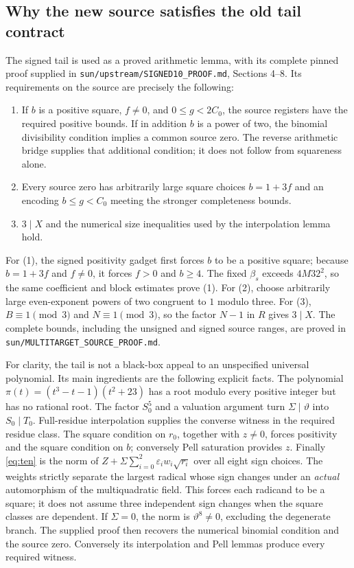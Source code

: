 \documentclass[11pt]{article}
\begin{document}
\subsection{Why the new source satisfies the old tail contract}
The signed tail is used as a proved arithmetic lemma, with its complete
pinned proof supplied in \texttt{sun/upstream/SIGNED10\_PROOF.md}, Sections
4--8. Its requirements on the source are precisely the following:
\begin{enumerate}
\item If $b$ is a positive square, $f\ne0$, and $0\le g<2C_0$, the source registers have the required positive bounds. If in addition
$b$ is a power of two, the binomial divisibility condition implies a common
source zero. The reverse arithmetic bridge supplies that additional condition;
it does not follow from squareness alone.
\item Every source zero has arbitrarily large square choices $b=1+3f$ and
an encoding $b\le g<C_0$ meeting the stronger completeness bounds.
\item $3\mid X$ and the numerical size inequalities used by the interpolation
lemma hold.
\end{enumerate}
For (1), the signed positivity gadget first forces $b$ to be a positive
square; because $b=1+3f$ and $f\ne0$, it forces $f>0$ and $b\ge4$.
The fixed $\beta_s$ exceeds $4M32^2$, so the same coefficient and block
estimates prove (1). For (2), choose arbitrarily large even-exponent powers
of two congruent to $1$ modulo three. For (3), $B\equiv1\pmod3$ and
$N\equiv1\pmod3$, so the factor $N-1$ in $R$ gives $3\mid X$.
The complete bounds, including the unsigned and signed source ranges, are
proved in \texttt{sun/MULTITARGET\_SOURCE\_PROOF.md}.

For clarity, the tail is not a black-box appeal to an unspecified universal
polynomial. Its main ingredients are the following explicit facts.
The polynomial $\pi(t)=(t^3-t-1)(t^2+23)$ has a root modulo every positive
integer but has no rational root. The factor $S_0^5$ and a valuation argument
turn $\Sigma\mid\vartheta$ into $S_0\mid T_0$. Full-residue interpolation
supplies the converse witness in the required residue class. The square
condition on $r_0$, together with $z\ne0$, forces positivity and the square
condition on $b$; conversely Pell saturation provides $z$.
Finally \eqref{eq:ten} is the norm of
$Z+\Sigma\sum_{i=0}^2\varepsilon_iw_i\sqrt{r_i}$ over all eight sign choices.
The weights strictly separate the largest radical whose sign changes under
an \emph{actual} automorphism of the multiquadratic field. This forces each
radicand to be a square; it does not assume three independent sign
changes when the square classes are dependent. If $\Sigma=0$, the norm is
$\vartheta^8\ne0$, excluding the degenerate branch. The supplied proof then
recovers the numerical binomial condition and the source zero. Conversely
its interpolation and Pell lemmas produce every required witness.
\end{document}
